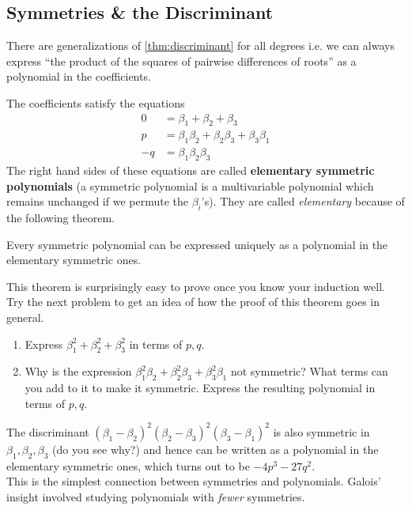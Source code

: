 \newpage
\subsection{Symmetries \& the Discriminant}

There are generalizations of \ref{thm:discriminant} for all degrees i.e. we can always express ``the product of the squares of pairwise differences of roots'' as a polynomial in the coefficients. 

The coefficients satisfy the equations 
\begin{align*}
	0  & = \beta_1 + \beta_2 + \beta_3                    \\
	p  & = \beta_1 \beta_2 + \beta_2 \beta_3 + \beta_3\beta_1 \\
	-q & = \beta_1 \beta_2 \beta_3                        
\end{align*}  
The right hand sides of these equations are called \textbf{elementary symmetric polynomials} (a symmetric polynomial is a multivariable polynomial which remains unchanged if we permute the $\beta_i$'s). They are called \emph{elementary} because of the following theorem.

\begin{thm}
	Every symmetric polynomial can be expressed uniquely as a polynomial in the elementary symmetric ones.
\end{thm}

This theorem is surprisingly easy to prove once you know your induction well. Try the next problem to get an idea of how the proof of this theorem goes in general.
\begin{questions}[resume]
	\item 
	\begin{enumerate}
		\item Express $ \beta_1^2 + \beta_2^2 + \beta_3^2$ in terms of $ p,q$. 
		
		\item Why is the expression $ \beta_1^2 \beta_2 + \beta_2^2 \beta_3  + \beta_3^2 \beta_1 $ not symmetric? What terms can you add to it to make it symmetric. Express the resulting polynomial in terms of $ p,q$. 
	\end{enumerate}
\end{questions}


The discriminant $(\beta_1 - \beta_2)^2(\beta_2 - \beta_3)^2(\beta_3 - \beta_1)^2$ is also symmetric in $ \beta_1, \beta_2, \beta_3$ (do you see why?) and hence can be written as a polynomial in the elementary symmetric ones, which turns out to be $-4p^3 - 27q^2$.\\

 This is the simplest connection between symmetries and polynomials. Galois' insight involved studying polynomials with \emph{fewer} symmetries.










